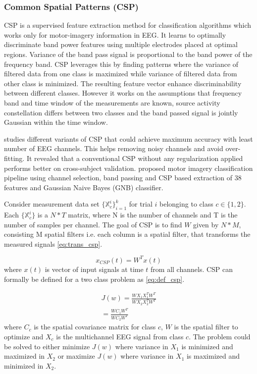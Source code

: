 \subsubsection{Common Spatial Patterns (CSP)}
CSP is a supervised feature extraction method for classification algorithms which works only for motor-imagery information in EEG. It learns to optimally discriminate band power features using multiple electrodes placed at optimal regions. Variance of the band pass signal is proportional to the band power of the frequency band. CSP leverages this by finding patterns where the  variance of filtered data from one class is maximized while variance of filtered data from other class is minimized. The resulting feature vector enhance discriminability between different classes. However it works on the assumptions that frequency band and time window of the measurements are known, source activity constellation differs between two classes and the band passed signal is jointly Gaussian within the time window. 

\cite{2017_EEGChannelSelection} studies different variants of CSP that could achieve maximum accuracy with least number of EEG channels. This helps removing noisy channels and avoid over-fitting. It revealed that a conventional CSP without any regularization applied performs better on cross-subject validation. \cite{2017_MI_ML_SP} proposed motor imagery classification pipeline using channel selection, band passing and  CSP based extraction of 38 features and Gaussian Naive Bayes (GNB) classifier.

Consider measurement data set $\{\mathbb{X}^{i}_{c}\}^{k}_{i=1}$ for trial $i$ belonging to class $c \in\{1,2\}$. Each $\{\mathbb{X}^{i}_{c}\}$ is a $N * T$ matrix, where N is the number of channels and T is the number of samples per channel. The goal of CSP is to find $W$ given by $N * M$, consisting M spatial filters i.e. each column is a  spatial filter, that transforms the measured signals \ref{eq:trans_csp}.

\begin{equation} \label{eq:trans_csp}
    x_{CSP}(t) = W^{T}x(t)
\end{equation}
where $x(t)$ is vector of input signals at time $t$ from all channels. CSP can formally be defined for a two class problem as \ref{eq:def_csp}.

\begin{equation} \label{eq:def_csp}
    \begin{split}
        J(w) = \frac{WX_{1}X_{1}^TW^T}{WX_{2}X_{2}^TW^T} \\
         = \frac{WC_{1}W^T}{WC_{2}W^T}
    \end{split}
\end{equation}
where $C_{c}$ is the spatial covariance matrix for class $c$, $W$ is the spatial filter to optimize and $X_{c}$ is the multichannel EEG signal from class $c$. The problem could be solved to either minimize $J(w)$ where variance in $X_{1}$ is minimized and maximized in $X_{2}$ or maximize $J(w)$ where variance in $X_{1}$ is maximized and minimized in $X_{2}$.

